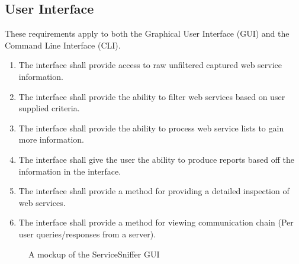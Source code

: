 \documentclass[titlepage]{article}
\begin{document}
\subsection{User Interface%
  \label{user-interface}%
}

These requirements apply to both the Graphical User Interface (GUI) and the
Command Line Interface (CLI).

\begin{enumerate}
    \item The interface shall provide access to raw unfiltered captured
        web service information.
    \item The interface shall provide the ability to filter web
        services based on user supplied criteria.
    \item The interface shall provide the ability to process web
        service lists to gain more information.
    \item The interface shall give the user the ability to produce
        reports based off the information in the interface.
    \item The interface shall provide a method for providing a
        detailed inspection of web services.
    \item The interface shall provide a method for viewing
        communication chain (Per user queries/responses from a server).
\end{enumerate}

\begin{figure}
    \centering
    \caption{A mockup of the ServiceSniffer GUI}
    \label{g:gui}
\end{figure}
\end{document}
